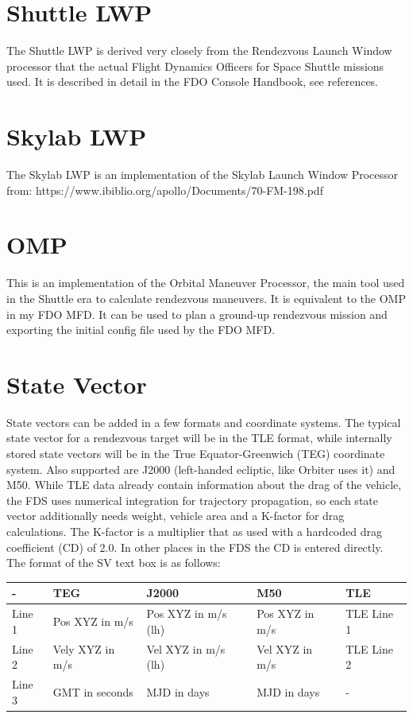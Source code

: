 \documentclass[11pt]{article} %
\begin{document}
\section{Shuttle LWP}
The Shuttle LWP is derived very closely from the Rendezvous Launch Window processor that the actual Flight Dynamics Officers for Space Shuttle missions used. It is described in detail in the FDO Console Handbook, see references.\\
\newpage
\section{Skylab LWP}
The Skylab LWP is an implementation of the Skylab Launch Window Processor from: https://www.ibiblio.org/apollo/Documents/70-FM-198.pdf
\newpage
\section{OMP}
This is an implementation of the Orbital Maneuver Processor, the main tool used in the Shuttle era to calculate rendezvous maneuvers. It is equivalent to the OMP in my FDO MFD. It can be used to plan a ground-up rendezvous mission and exporting the initial config file used by the FDO MFD.\\
\newpage
\section{State Vector}
State vectors can be added in a few formats and coordinate systems. The typical state vector for a rendezvous target will be in the TLE format, while internally stored state vectors will be in the True Equator-Greenwich (TEG) coordinate system. Also supported are J2000 (left-handed ecliptic, like Orbiter uses it) and M50. While TLE data already contain information about the drag of the vehicle, the FDS uses numerical integration for trajectory propagation, so each state vector additionally needs weight, vehicle area and a K-factor for drag calculations. The K-factor is a multiplier that as used with a hardcoded drag coefficient (CD) of 2.0. In other places in the FDS the CD is entered directly.\\
The format of the SV text box is as follows:\\
\begin{center}
\begin{tabular}{|l|l|l|l|l| }
\hline
-&TEG&J2000&M50&TLE\\
\hline
Line 1&Pos XYZ in m/s&Pos XYZ in m/s (lh)&Pos XYZ in m/s&TLE Line 1\\
\hline
Line 2&Vely XYZ in m/s&Vel XYZ in m/s (lh)&Vel XYZ in m/s&TLE Line 2 \\
\hline
Line 3& GMT in seconds&MJD in days&MJD in days&-\\
\hline
\end{tabular}
\end{center}
\newpage
\end{document}
